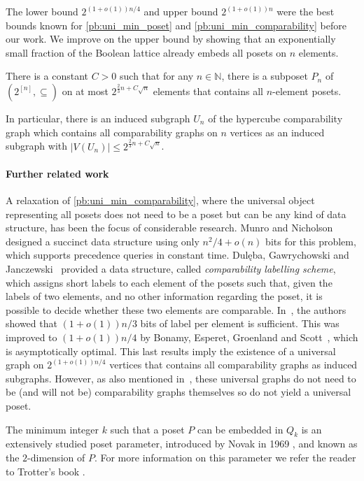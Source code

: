 \documentclass[11pt]{article}
\newcommand{\NN}{\ensuremath{\mathbb N}}
\newcommand{\1}{\mathbbm{1}}
\begin{document}
The lower bound $2^{(1+o(1))n/4}$ and upper bound $2^{(1+o(1))n}$ were the best bounds known for \cref{pb:uni_min_poset} and \cref{pb:uni_min_comparability} before our work.  
We improve on the upper bound by 
showing that an exponentially small fraction of the Boolean lattice already embeds all posets on $n$ elements. 
\begin{theorem}
    \label{thm:uni_poset_2/3_hypercube}
    There is a constant $C>0$ such that for any $n \in \NN$, there is a subposet $P_n$ of $(2^{[n]},\subseteq)$ on at most $2^{\frac23 n + C\sqrt{n}}$ elements that contains all $n$-element posets. 
\end{theorem}
In particular, there is an induced subgraph $U_n$ of the hypercube comparability graph which contains all comparability graphs on $n$ vertices as an induced subgraph with $|V(U_n)| \leq 2^{\frac23 n + C\sqrt{n}}$.

\paragraph{Further related work}
A relaxation of \cref{pb:uni_min_comparability}, where the universal object representing all posets does not need to be a poset but can be any kind of data structure, has been the focus of considerable research. Munro and Nicholson~\cite{MunroNicholson} designed a succinct data structure using only \(n^2/4 + o(n)\) bits for this problem, which supports precedence queries in constant time. 
Dul\k{e}ba, Gawrychowski and Janczewski~\cite{DulebaGawrychowskiJanczewski} provided a data structure, called \emph{comparability labelling scheme}, which assigns short labels to each element of the posets such that, given the labels of two elements, and no other information regarding the poset, it is possible to decide whether these two elements are comparable. In~\cite{DulebaGawrychowskiJanczewski}, the authors showed that $(1+o(1))n/3$ bits of label per element is sufficient. This was improved to $(1+o(1))n/4$ by Bonamy, Esperet, Groenland and Scott~\cite{BonamyEsperetGroenlandScott21}, which is asymptotically optimal. This last results imply the existence of a universal graph on $2^{(1+o(1))n/4}$ vertices that contains all comparability graphs as induced subgraphs. However, as also mentioned in~\cite{BonamyEsperetGroenlandScott21}, these universal graphs do not need to be (and will not be) comparability graphs themselves so do not yield a universal poset.

The minimum integer $k$ such that a poset $P$ can be embedded in $Q_k$ is an extensively studied poset parameter, introduced by Novak in 1969 \cite{novak1969well}, and known as the $2$-dimension of $P$. For more information on this parameter we refer the reader to Trotter's book \cite{trotter2002combinatorics}.
\end{document}
